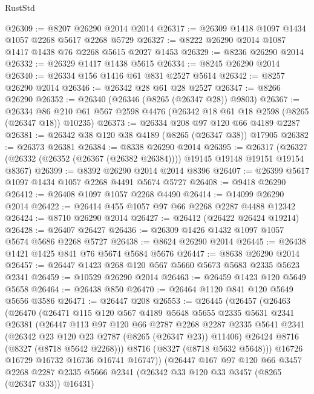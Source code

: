 \begin{lexlean}{RustStd}
\begin{coremodule}
{\begin{coremodule}
{{{{{{{{{{{{{{{{{{{{{{{{{{{{{{{{{{{{{{{{{{{{{{{{{{{{{{@26309 := @8207 @26290 @2014 @2014
@26317 := @26309 @1418 @1097 @1434 @1057 @2268 @5617 @2268 @5729
@26327 := @8222 @26290 @2014 @1087 @1417 @1438 @76 @2268 @5615 @2027 @1453
@26329 := @8236 @26290 @2014
@26332 := @26329 @1417 @1438 @5615
@26334 := @8245 @26290 @2014
@26340 := @26334 @156 @1416 @61 @831 @2527 @5614
@26342 := @8257 @26290 @2014
@26346 := @26342 @28 @61 @28 @2527
@26347 := @8266 @26290
@26352 := @26340 (@26346 (@8265 (@26347 @28)) @9803)
@26367 := @26334
    @86
    @210
    @61
    @567
    @2598
    @4476
    (@26342 @18 @61 @18 @2598 (@8265 (@26347 @18)) @10235)
@26373 := @26334 @208 @97 @120 @66 @4189 @2287
@26381 := @26342 @38 @120 @38 @4189 (@8265 (@26347 @38)) @17905
@26382 := @26373 @26381
@26384 := @8338 @26290 @2014
@26395 := @26317
    (@26327 (@26332 (@26352 (@26367 (@26382 @26384)))) @19145 @19148 @19151 @19154 @8367)
@26399 := @8392 @26290 @2014 @2014 @8396
@26407 := @26399 @5617 @1097 @1434 @1057 @2268 @4491 @5674 @5727
@26408 := @9418 @26290
@26412 := @26408 @1097 @1057 @2268 @4490
@26414 := @14099 @26290 @2014
@26422 := @26414 @455 @1057 @97 @66 @2268 @2287 @4488 @12342
@26424 := @8710 @26290 @2014
@26427 := @26412 (@26422 @26424 @19214)
@26428 := @26407 @26427
@26436 := @26309 @1426 @1432 @1097 @1057 @5674 @5686 @2268 @5727
@26438 := @8624 @26290 @2014
@26445 := @26438 @1421 @1425 @841 @76 @5674 @5684 @5676
@26447 := @8638 @26290 @2014
@26457 := @26447 @1423 @268 @120 @567 @5660 @5673 @5683 @2335 @5623 @2341
@26459 := @10529 @26290 @2014
@26463 := @26459 @1423 @120 @5649 @5658
@26464 := @26438 @850
@26470 := @26464 @1120 @841 @120 @5649 @5656 @3586
@26471 := @26447 @208
@26553 := @26445
    (@26457
      (@26463
        (@26470
          (@26471
            @115
            @120
            @567
            @4189
            @5648
            @5655
            @2335
            @5631
            @2341
            @26381
            (@26447
              @113
              @97
              @120
              @66
              @2787
              @2268
              @2287
              @2335
              @5641
              @2341
              (@26342 @23 @120 @23 @2787 (@8265 (@26347 @23)) @11406)
              @26424
              @8716
              (@8327 (@8718 @5642 @2268)))
            @8716
            (@8327 (@8718 @5632 @5648)))
          @16726
          @16729
          @16732
          @16736
          @16741
          @16747))
      (@26447
        @167
        @97
        @120
        @66
        @3457
        @2268
        @2287
        @2335
        @5666
        @2341
        (@26342 @33 @120 @33 @3457 (@8265 (@26347 @33)) @16431)
}}}}}}}}}}}}}}}}}}}}}}}}}}}}}}}}}}}}}}}}}}}}}}}}}}}}}}
\end{coremodule}}
\end{coremodule}
\end{lexlean}
